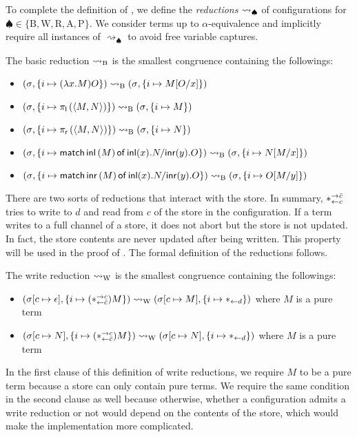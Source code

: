 {To complete the definition of \lgd,
 we define the \textit{reductions} $\rightsquigarrow_\spadesuit$ of
 configurations for $\spadesuit\in\{\mathrm B, \mathrm W, \mathrm R, \mathrm A,
 \mathrm P\}$.
 We consider terms up to $\alpha$-equivalence and implicitly
 require all instances
 of $\rightsquigarrow_\spadesuit$ to avoid free variable captures.

\begin{definition}
 The basic reduction $\rightsquigarrow_{\mathrm B}$ is the smallest congruence containing
 the followings:
 \begin{itemize}
  \item  $({\sigma}{},{\{i\mapsto {(\lambda x.M)O}\}})\rightsquigarrow_{\mathrm B}
	 ({\sigma}{},{\{i\mapsto {M[O/x]}\}})$
  \item $({\sigma}{},{\{i\mapsto {\pi_{\mathsf l}\left({\langle{M,N}\rangle}\right)}\}}) \rightsquigarrow_{\mathrm B}
	 ({\sigma}{},{           \{i\mapsto {M}\}   })$
  \item $({\sigma}{},{\{i\mapsto {\pi_{\mathsf r}\left({\langle{M,N}\rangle}\right)}\}}) \rightsquigarrow_{\mathrm B}
	 ({\sigma}{},{             \{i\mapsto {N}\} })$
  \item $({\sigma}{},{\{i\mapsto {\mathsf{match}\,{\mathsf{inl}\left({M}\right)}\,\mathsf{of}\, \mathsf{inl}({x}). {N}/ \mathsf{inr}({y}). {O}}\}}) \rightsquigarrow_{\mathrm B}
	 ({\sigma}{},{              \{i\mapsto {N[M/x]}\}})$
  \item $({\sigma}{},{\{i\mapsto {\mathsf{match}\,{\mathsf{inr}\left({M}\right)}\,\mathsf{of}\, \mathsf{inl}({x}). {N}/ \mathsf{inr}({y}). {O}}\}}) \rightsquigarrow_{\mathrm B}
	 ({\sigma}{},{                  \{i\mapsto {O[M/y]}\}})$
 \end{itemize}
\end{definition}

There are two sorts of reductions that interact with the store.
In summary, $\ast^{\rightarrow {\bar{c}}}_{\leftarrow{c}}$ tries to write to $d$ and read from
$c$ of the store in the configuration.
 If a term writes to a full channel of
a store, it does not abort but the store is not updated.  In fact, the
store contents are never updated after being written.
This property will be used in the proof of .
The formal definition of the reductions follows.
\begin{definition}
 The write reduction $\rightsquigarrow_{\mathrm W}$ is the smallest congruence
 containing the followings:
 \begin{itemize}
  \item $({\sigma}{[c\mapsto \epsilon]},{\{i\mapsto {(\ast^{\rightarrow {c}}_{\leftarrow{\bar{c}}})M}\}}) \rightsquigarrow_{\mathrm W}
	({\sigma}{[c\mapsto M]},{\{i\mapsto {\ast_{\leftarrow{d}}}\}})
	$ where $M$ is a pure term
  \item $({\sigma}{[c\mapsto N]},{\{i\mapsto {(\ast^{\rightarrow {c}}_{\leftarrow{\bar{c}}}) M}\}}) \rightsquigarrow_{\mathrm W}
	({\sigma}{[c\mapsto	N]},{\{i\mapsto {\ast_{\leftarrow{d}}}\}})$ where $M$ is a pure term
 \end{itemize}
\end{definition}
In the first clause of this definition of write reductions, we require
$M$ to be a pure
term because a store can only contain pure terms.
We require the same condition in the second clause as well because
otherwise, whether a configuration admits a write reduction or not
would depend on the contents of the store, which would make the
implementation more complicated.

}
